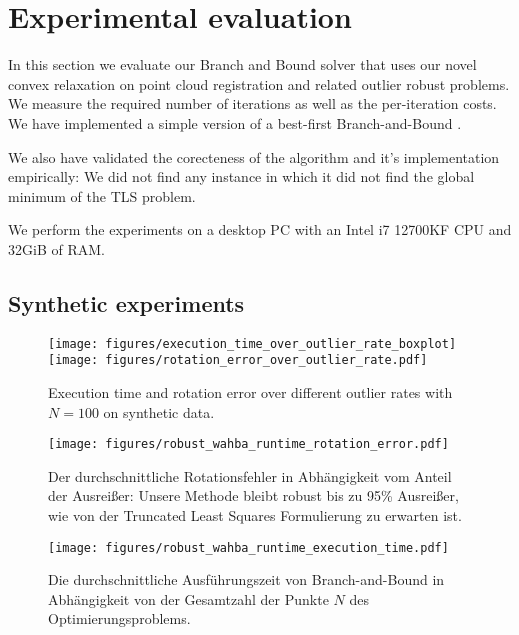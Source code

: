 
\section{Experimental evaluation}
\label{sec:evaluation}
In this section we evaluate our Branch and Bound solver that uses our novel convex relaxation on point cloud registration and related outlier robust problems. 
We measure the required number of iterations as well as the per-iteration costs. We have implemented a simple version of a best-first Branch-and-Bound \cite{10.1007/978-3-642-37444-9_42}.

We also have validated the corecteness of the algorithm and it's implementation empirically: We did not find any instance in which it did not find the global minimum of the TLS problem.


We perform the experiments on a desktop PC with an Intel i7 12700KF CPU and 32GiB of RAM.

\subsection{Synthetic experiments}
\begin{figure}[!ht]
	\centering
	\texttt{[image: figures/execution\_time\_over\_outlier\_rate\_boxplot]}
	\texttt{[image: figures/rotation\_error\_over\_outlier\_rate.pdf]}
	\caption{Execution time and rotation error over different outlier rates with $N=100$ on synthetic data.}
	\label{fig:execution-time-over-outlier-rate}
\end{figure}


\begin{figure}[!ht]
	\centering
	\begin{adjustbox}{width=1.\linewidth}
		\texttt{[image: figures/robust\_wahba\_runtime\_rotation\_error.pdf]}
	\end{adjustbox}
	\caption{Der durchschnittliche Rotationsfehler in Abhängigkeit vom Anteil der Ausreißer: Unsere Methode bleibt robust bis zu 95\% Ausreißer, wie von der Truncated Least Squares Formulierung zu erwarten ist.}
	\label{fig:rotation-error-over-outlier-rate}
\end{figure}


\begin{figure}[!ht]
	\centering
	\begin{adjustbox}{width=1.\linewidth}
		\texttt{[image: figures/robust\_wahba\_runtime\_execution\_time.pdf]}
	\end{adjustbox}
	\caption{Die durchschnittliche Ausführungszeit von Branch-and-Bound in Abhängigkeit von der Gesamtzahl der Punkte $N$ des Optimierungsproblems.}
	\label{fig:runtime}
\end{figure}


